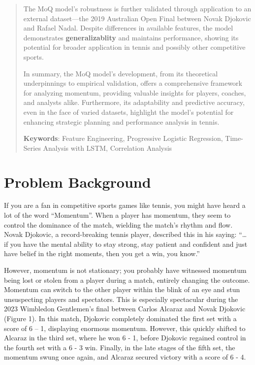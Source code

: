 \documentclass[12pt]{article}  %
\begin{document}
\begin{abstract}
The MoQ model's robustness is further validated through application to an external dataset—the 2019 Australian Open Final between Novak Djokovic and Rafael Nadal. Despite differences in available features, the model demonstrates \textbf{generalizablity} and maintains performance, showing its potential for broader application in tennis and possibly other competitive sports.

In summary, the MoQ model's development, from its theoretical underpinnings to empirical validation, offers a comprehensive framework for analyzing momentum, providing valuable insights for players, coaches, and analysts alike. Furthermore, its adaptability and predictive accuracy, even in the face of varied datasets, highlight the model's potential for enhancing strategic planning and performance analysis in tennis.

\vspace{15pt}  %
\textbf{Keywords}: Feature Engineering, Progressive Logistic Regression, Time-Series Analysis with LSTM, Correlation Analysis

\end{abstract}

\maketitle  %



\tableofcontents  




\section{Problem Background}
If you are a fan in competitive sports games like tennis, you might have heard a lot of the word “Momentum”. When a player has momentum, they seem to control the dominance of the match, wielding the match's rhythm and flow. Novak Djokovic, a record-breaking tennis player, described this in his saying: “… if you have the mental ability to stay strong, stay patient and confident and just have belief in the right moments, then you get a win, you know.”

However, momentum is not stationary; you probably have witnessed momentum being lost or stolen from a player during a match, entirely changing the outcome. Momentum can switch to the other player within the blink of an eye and stun unsuspecting players and spectators. This is especially spectacular during the 2023 Wimbledon Gentlemen’s final between Carlos Alcaraz and Novak Djokovic (Figure 1). In this match, Djokovic completely dominated the first set with a score of 6 – 1, displaying enormous momentum. However, this quickly shifted to Alcaraz in the third set, where he won 6 - 1, before Djokovic regained control in the fourth set with a 6 - 3 win. Finally, in the late stages of the fifth set, the momentum swung once again, and Alcaraz secured victory with a score of 6 - 4.
\end{document}
